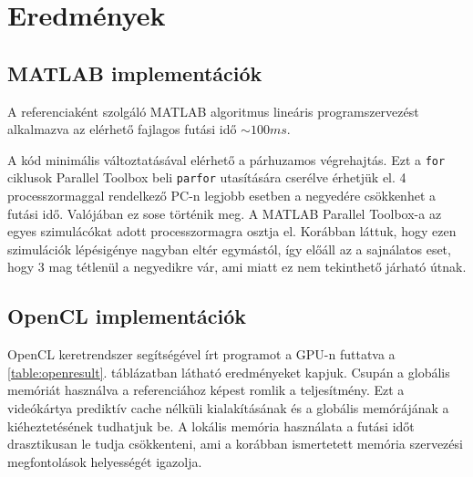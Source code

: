  \section{Eredmények}
 	
	\subsection{MATLAB implementációk}
	A referenciaként szolgáló MATLAB algoritmus lineáris programszervezést
	alkalmazva az elérhető fajlagos futási idő $\sim100 ms$.
	
	A kód minimális változtatásával elérhető a párhuzamos végrehajtás. Ezt a
	\texttt{for} ciklusok Parallel Toolbox beli \texttt{parfor} utasítására
	cserélve érhetjük el. 4 processzormaggal rendelkező PC-n  legjobb esetben a negyedére csökkenhet a
	futási idő. Valójában ez sose történik meg.
	A MATLAB Parallel Toolbox-a az egyes szimulácókat adott processzormagra osztja el.
	Korábban láttuk, hogy ezen szimulációk lépésigénye nagyban eltér egymástól, így előáll az a
	sajnálatos eset, hogy 3 mag tétlenül a negyedikre vár, ami miatt ez nem tekinthető járható útnak. 
	
	\subsection{OpenCL implementációk}
	OpenCL keretrendszer segítségével írt programot a GPU-n futtatva a
	\ref{table:openresult}. táblázatban látható eredményeket kapjuk.
	Csupán a globális memóriát használva a referenciához képest romlik a
	teljesítmény. Ezt a videókártya prediktív cache nélküli kialakításának és a
	globális memórájának a kiéheztetésének tudhatjuk be.
	A lokális memória használata a futási időt drasztikusan le tudja
	csökkenteni, ami a korábban ismertetett memória szervezési megfontolások
	helyességét igazolja.
	
	
	
	
	
